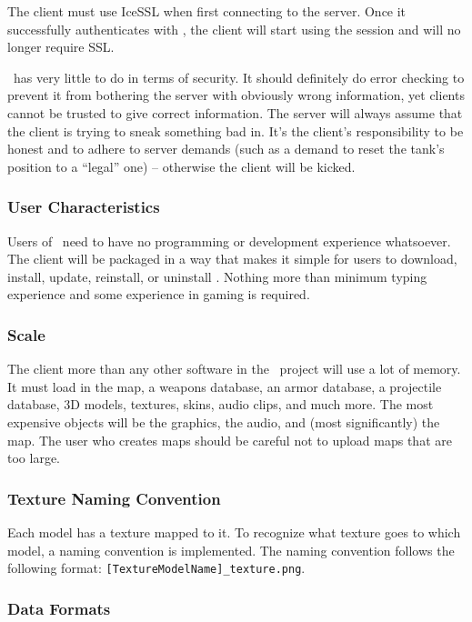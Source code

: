The client must use IceSSL when first connecting to the server. Once it successfully authenticates with \MainServer, the client will start using the session and will no longer require SSL.

\Client\ has very little to do in terms of security. It should definitely do error checking to prevent it from bothering the server with obviously wrong information, yet clients cannot be trusted to give correct information. The server will always assume that the client is trying to sneak something bad in. It's the client's responsibility to be honest and to adhere to server demands (such as a demand to reset the tank's position to a ``legal'' one) -- otherwise the client will be kicked.

\subsubsection*{User Characteristics}

Users of \Client\ need to have no programming or development experience whatsoever. The client will be packaged in a way that makes it simple for users to download, install, update, reinstall, or uninstall \Client. Nothing more than minimum typing experience and some experience in gaming is required.

\subsubsection*{Scale}

The client more than any other software in the \VTank\ project will use a lot of memory. It must load in the map, a weapons database, an armor database, a projectile database, 3D models, textures, skins, audio clips, and much more. The most expensive objects will be the graphics, the audio, and (most significantly) the map. The user who creates maps should be careful not to upload maps that are too large.

\subsubsection*{Texture Naming Convention}

Each model has a texture mapped to it. To recognize what texture goes to which model, a naming convention is implemented. The naming convention follows the following format:  \texttt{[TextureModelName]\_texture.png}.

\subsubsection*{Data Formats}

